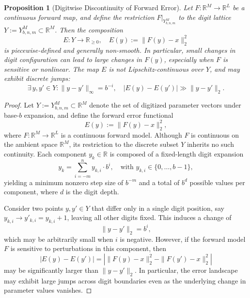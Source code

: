 \documentclass[aps,twocolumn,superscriptaddress,nofootinbib]{revtex4}
\newtheorem{proposition}{Proposition}
\begin{document}
\begin{proposition}[Digitwise Discontinuity of Forward Error]
Let \( F: \mathbb{R}^M \to \mathbb{R}^L \) be a continuous forward map, and define the restriction \( F|_{Y^M_{b,n,m}} \) to the digit lattice \( Y := Y^M_{b,n,m} \subset \mathbb{R}^M \). Then the composition
\[
E: Y \to \mathbb{R}_{\geq 0}, \quad E(y) := \|F(y) - x\|_2^2
\]
is piecewise-defined and generally non-smooth. In particular, small changes in digit configuration can lead to large changes in \( F(y) \), especially when \( F \) is sensitive or nonlinear. The map \( E \) is not Lipschitz-continuous over \( Y \), and may exhibit discrete jumps:
\[
\exists\, y, y' \in Y : \|y - y'\|_\infty = b^{-i},\quad |E(y) - E(y')| \gg \|y - y'\|_2.
\]
\end{proposition}

\begin{proof}
Let \( Y := Y^M_{b,n,m} \subset \mathbb{R}^M \) denote the set of digitized parameter vectors under base-\(b\) expansion, and define the forward error functional
\begin{equation}
E(y) := \|F(y) - x\|_2^2,
\end{equation}
where \( F: \mathbb{R}^M \to \mathbb{R}^L \) is a continuous forward model. Although \( F \) is continuous on the ambient space \( \mathbb{R}^M \), its restriction to the discrete subset \( Y \) inherits no such continuity. Each component \( y_k \in \mathbb{R} \) is composed of a fixed-length digit expansion
\begin{equation}
y_k = \sum_{i = -m}^{n} y_{k,i} \cdot b^i, \quad \text{with } y_{k,i} \in \{0, \dots, b - 1\},
\end{equation}
yielding a minimum nonzero step size of \( b^{-m} \) and a total of \( b^d \) possible values per component, where $d$ is the digit depth.

Consider two points \( y, y' \in Y \) that differ only in a single digit position, say \( y_{k,i} \to y'_{k,i} = y_{k,i} + 1 \), leaving all other digits fixed. This induces a change of
\begin{equation}
\|y - y'\|_2 = b^i,
\end{equation}
which may be arbitrarily small when \( i \) is negative. However, if the forward model \( F \) is sensitive to perturbations in this component, then
\begin{equation}
|E(y) - E(y')| = \left| \|F(y) - x\|_2^2 - \|F(y') - x\|_2^2 \right|
\end{equation}
may be significantly larger than \( \|y - y'\|_2 \). In particular, the error landscape may exhibit large jumps across digit boundaries even as the underlying change in parameter values vanishes.


\end{proof}
\end{document}
